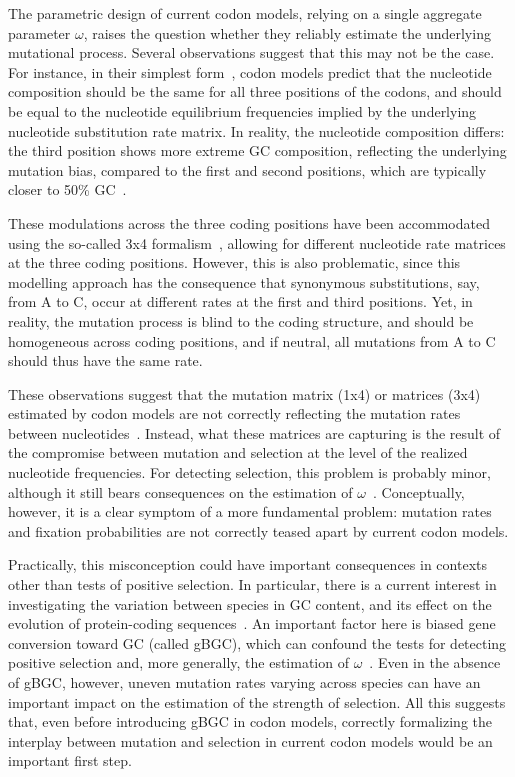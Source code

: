 \documentclass{article}
\begin{document}
The parametric design of current codon models, relying on a single aggregate parameter $\omega$, raises the question whether they reliably estimate the underlying mutational process.
Several observations suggest that this may not be the case.
For instance, in their simplest form~\citep{Muse1994, Goldman1994}, codon models predict that the nucleotide composition should be the same for all three positions of the codons, and should be equal to the nucleotide equilibrium frequencies implied by the underlying nucleotide {substitution} rate matrix.
In reality, the nucleotide composition differs: the third position shows more extreme GC composition, reflecting the underlying mutation bias, compared to the first and second positions, which are typically closer to 50\% GC~\citep{Singer2000}.

These modulations across the three coding positions have been accommodated using the so-called 3x4 formalism~\citep{Goldman1994, Pond2005a}, allowing for different nucleotide rate matrices at the three coding positions.
However, this is also problematic, since this modelling approach has the consequence that {synonymous} {substitutions}, say, from A to C, occur at different rates at the first and third positions.
Yet, in reality, the mutation process is blind to the coding structure, and should be homogeneous across coding positions, and if {neutral}, all mutations from A to C should thus have the same rate.

These observations suggest that the mutation matrix (1x4) or matrices (3x4) estimated by codon models are not correctly reflecting the mutation rates between nucleotides~\citep{Rodrigue2008a}.
Instead, what these matrices are capturing is the result of the compromise between mutation and selection at the level of the realized nucleotide frequencies.
For detecting selection, this problem is probably minor, although it still bears consequences on the estimation of $\omega$~\citep{Spielman2015}.
Conceptually, however, it is a clear symptom of a more fundamental problem: mutation rates and fixation probabilities are not correctly teased apart by current codon models.

Practically, this misconception could have important consequences in contexts other than tests of positive selection.
In particular, there is a current interest in investigating the variation between species in GC content, and its effect on the evolution of protein-coding sequences~\citep{Bolivar2019}.
An important factor here is biased gene conversion toward GC (called {gBGC}), which can confound the tests for detecting positive selection and, more generally, the estimation of $\omega$~\citep{Galtier2009,Ratnakumar2010, Figuet2014}.
Even in the absence of {gBGC}, however, uneven mutation rates varying across species can have an important impact on the estimation of the strength of selection.
All this suggests that, even before introducing {gBGC} in codon models, correctly formalizing the interplay between mutation and selection in current codon models would be an important first step.
\end{document}
